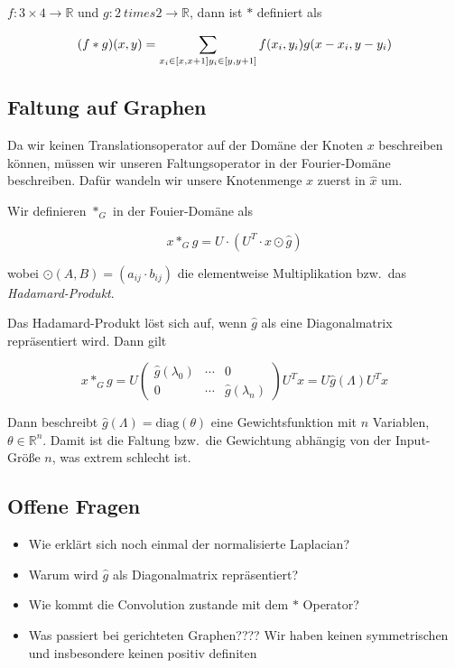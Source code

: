 $f: 3 \times 4 \rightarrow \mathbb{R}$ und $g: 2 \ times 2 \rightarrow \mathbb{R}$, dann ist $*$ definiert als

\begin{equation}
  (f * g)(x, y) = \sum_{x_i \in [x, x+1]\\y_i \in [y, y+1]} f(x_i, y_i)g(x-x_i, y-y_i)
\end{equation}

\subsection{Faltung auf Graphen}

Da wir keinen Translationsoperator auf der Domäne der Knoten $x$ beschreiben können, müssen wir unseren Faltungsoperator in der Fourier-Domäne beschreiben.
Dafür wandeln wir unsere Knotenmenge $x$ zuerst in $\hat x$ um.

Wir definieren $*_G$ in der Fouier-Domäne als

\begin{equation}
  x *_G g = U \cdot (U^T \cdot x \odot \hat g)
\end{equation}

wobei $\odot(A, B) = (a_{ij} \cdot b_{ij})$ die elementweise Multiplikation bzw.\ das \emph{Hadamard-Produkt}.

Das Hadamard-Produkt löst sich auf, wenn $\hat g$ als eine Diagonalmatrix repräsentiert wird. Dann gilt

\begin{equation}
  x *_G g = U \begin{pmatrix}
    \hat g(\lambda_0) & \cdots & 0\\
    0 & \cdots & \hat g(\lambda_n)
  \end{pmatrix}U^T x = U \hat g(\Lambda) U^T x
\end{equation}

Dann beschreibt $\hat g(\Lambda) = \text{diag}(\theta)$ eine Gewichtsfunktion mit $n$ Variablen, $\theta \in \mathbb{R}^n$.
Damit ist die Faltung bzw.\ die Gewichtung abhängig von der Input-Größe $n$, was extrem schlecht ist.

\subsection{Offene Fragen}

\begin{itemize}
  \item Wie erklärt sich noch einmal der normalisierte Laplacian?
  \item Warum wird $\hat g$ als Diagonalmatrix repräsentiert?
  \item Wie kommt die Convolution zustande mit dem $*$ Operator?
  \item Was passiert bei gerichteten Graphen???? Wir haben keinen symmetrischen und insbesondere keinen positiv definiten
\end{itemize}

